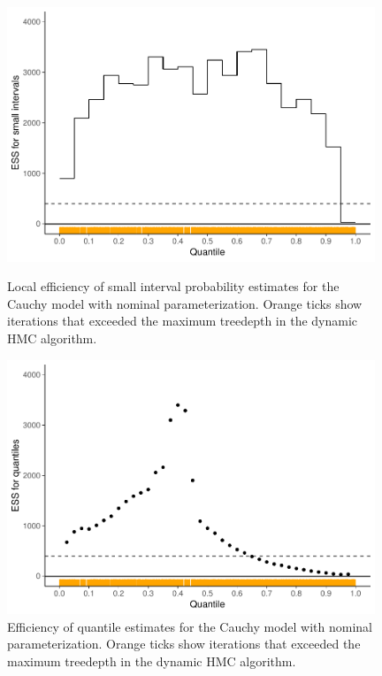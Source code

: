 \documentclass[american,]{article}
\theoremstyle{definition}
\begin{document}
\begin{figure}[tp]
  \centering
  \begin{minipage}{0.48\textwidth}
  \includegraphics[width=0.98\textwidth]{graphics/local-ess-fit-nom-1.pdf}
  \caption{Local efficiency of small interval probability
    estimates for the Cauchy model with nominal parameterization. Orange
    ticks show iterations that exceeded the maximum treedepth in
    the dynamic HMC algorithm.}
\label{fig:local-ess-fit-nom-1}
\end{minipage}
\hfill
  \begin{minipage}{0.48\textwidth}
  \includegraphics[width=0.98\textwidth]{graphics/quantile-ess-fit-nom-1.pdf}
  \caption{Efficiency of quantile estimates for the Cauchy model with nominal 
  parameterization. Orange ticks show iterations that exceeded the maximum 
  treedepth in the dynamic HMC algorithm.\\~}
  \label{fig:quantile-ess-fit-nom-1}
\end{minipage}
\end{figure}
\end{document}
